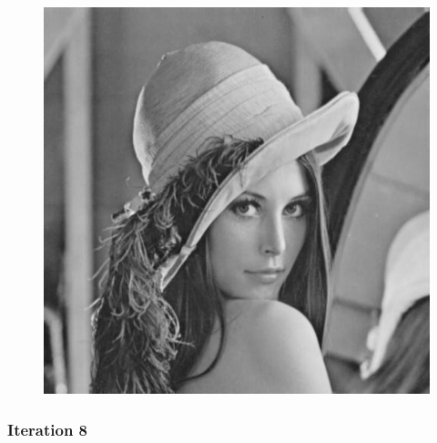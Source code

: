 \documentclass[11pt]{article}
\makeatletter
\def\maxwidth{\ifdim\Gin@nat@width>\linewidth\linewidth
    \else\Gin@nat@width\fi}
\let\Oldincludegraphics\includegraphics
\renewcommand{\includegraphics}[1]{\Oldincludegraphics[width=.8\maxwidth]{#1}}
\makeatother
\begin{document}
\begin{figure}[!htbp]
	\centering
	\includegraphics{"3th iterations_const"}
	\label{fig:3th-iterationsconst}
\end{figure}
\clearpage
    \hypertarget{iteration-8}{%
\subsubsection{Iteration 8}\label{iteration-8}}
\end{document}
